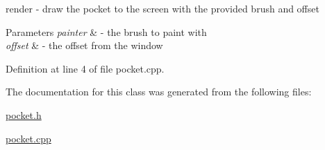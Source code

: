 render -\/ draw the pocket to the screen with the provided brush and offset 


\begin{DoxyParams}{Parameters}
{\em painter} & -\/ the brush to paint with \\
\hline
{\em offset} & -\/ the offset from the window \\
\hline
\end{DoxyParams}


Definition at line 4 of file pocket.\+cpp.



The documentation for this class was generated from the following files\+:\begin{DoxyCompactItemize}
\item 
\mbox{\hyperlink{pocket_8h}{pocket.\+h}}\item 
\mbox{\hyperlink{pocket_8cpp}{pocket.\+cpp}}\end{DoxyCompactItemize}
